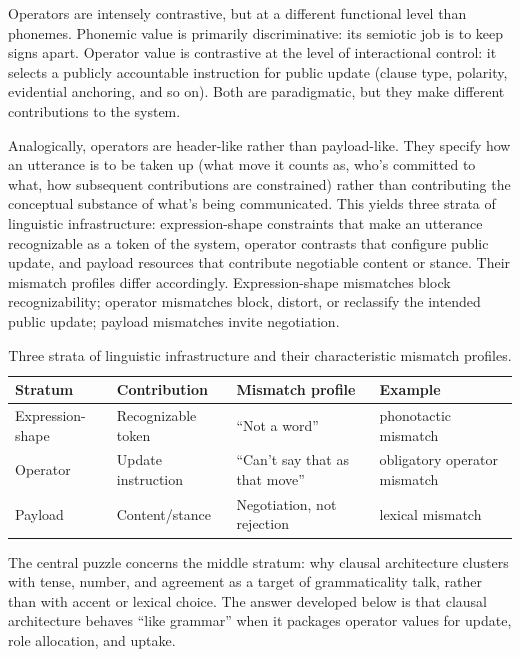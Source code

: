 \documentclass[12pt,letterpaper]{article}
\begin{document}
Operators are intensely contrastive, but at a different functional level than phonemes. Phonemic value is primarily discriminative: its semiotic job is to keep signs apart. Operator value is contrastive at the level of interactional control: it selects a publicly accountable instruction for public update (clause type, polarity, evidential anchoring, and so on). Both are paradigmatic, but they make different contributions to the system.

Analogically, operators are header-like rather than payload-like. They specify how an utterance is to be taken up (what move it counts as, who's committed to what, how subsequent contributions are constrained) rather than contributing the conceptual substance of what's being communicated. This yields three strata of linguistic infrastructure: expression-shape constraints that make an utterance recognizable as a token of the system, operator contrasts that configure public update, and payload resources that contribute negotiable content or stance. Their mismatch profiles differ accordingly. Expression-shape mismatches block recognizability; operator mismatches block, distort, or reclassify the intended public update; payload mismatches invite negotiation.

\begin{table}[ht]
\centering
\footnotesize
\begin{tabular}{@{}llll@{}}
\toprule
\textbf{Stratum} & \textbf{Contribution} & \textbf{Mismatch profile} & \textbf{Example} \\
\midrule
Expression-shape & Recognizable token & \enquote{Not a word} & phonotactic mismatch \\
Operator & Update instruction & \enquote{Can't say that as that move} & obligatory operator mismatch \\
Payload & Content/stance & Negotiation, not rejection & lexical mismatch \\
\bottomrule
\end{tabular}
\caption{Three strata of linguistic infrastructure and their characteristic mismatch profiles.}
\label{tab:strata}
\end{table}

The central puzzle concerns the middle stratum: why clausal architecture clusters with tense, number, and agreement as a target of grammaticality talk, rather than with accent or lexical choice. The answer developed below is that clausal architecture behaves \enquote{like grammar} when it packages operator values for update, role allocation, and uptake.
\end{document}
